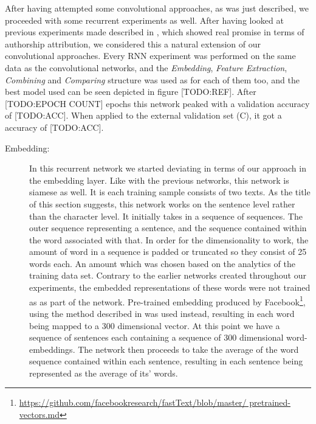 After having attempted some convolutional approaches, as was just described,
we proceeded with some recurrent experiments as well. After having looked at
previous experiments made described in \cite{qian:2018}, which showed real
promise in terms of authorship attribution, we considered this a natural
extension of our convolutional approaches. Every \gls{RNN} experiment
was performed on the same data as the convolutional networks, and the
\textit{Embedding}, \textit{Feature Extraction}, \textit{Combining} and
\textit{Comparing} structure was used as for each of them too, and the best
model used can be seen depicted in figure [TODO:REF]. After [TODO:EPOCH COUNT]
epochs this network peaked with a validation accuracy of [TODO:ACC]. When
applied to the external validation set (C), it got a accuracy of [TODO:ACC].

\begin{description}

\item[Embedding:] In this recurrent network we started deviating in terms of
our approach in the embedding layer. Like with the previous
networks, this network is siamese as well. It is each training sample
consists of two texts. As the title of this section suggests,
this network works on the sentence level rather than the character level. It
initially takes in a sequence of sequences. The outer sequence representing a
sentence, and the sequence contained within the word associated with that. In
order for the dimensionality to work, the amount of word in a sequence is padded
or truncated so they consist of 25 words each. An amount which was chosen based
on the analytics of the training data set. Contrary to the earlier networks
created throughout our experiments, the embedded representations of these words
were not trained as as part of the network. Pre-trained embedding produced by
Facebook\footnote{\url{https://github.com/facebookresearch/fastText/blob/master/
pretrained-vectors.md}}, using the method described in
\cite{bojanowski2016enriching} was used instead, resulting in each word being
mapped to a 300 dimensional vector. At this point we have a sequence of
sentences each containing a sequence of 300 dimensional word-embeddings. The
network then proceeds to take the average of the word sequence contained within
each sentence, resulting in each sentence being represented as the average of
its' words.


\end{description}
